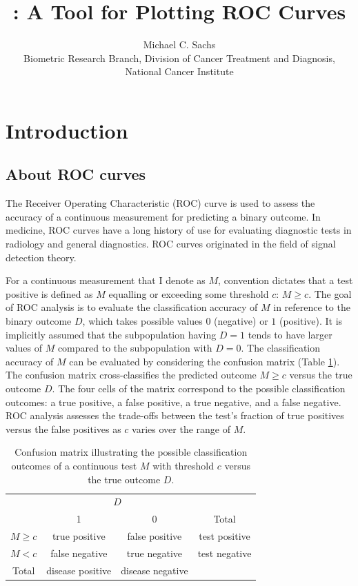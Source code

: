 \documentclass[codesnippet]{jss}
\author{		Michael C. Sachs\\Biometric Research Branch, Division of Cancer Treatment and Diagnosis,
National Cancer Institute		}
\title{\pkg{plotROC}: A Tool for Plotting ROC Curves}
\begin{document}
\section{Introduction}\label{introduction}

\subsection{About ROC curves}\label{about-roc-curves}

The Receiver Operating Characteristic (ROC) curve is used to assess the
accuracy of a continuous measurement for predicting a binary outcome. In
medicine, ROC curves have a long history of use for evaluating
diagnostic tests in radiology and general diagnostics. ROC curves
originated in the field of signal detection theory.

For a continuous measurement that I denote as \(M\), convention dictates
that a test positive is defined as \(M\) equalling or exceeding some
threshold \(c\): \(M \geq c\). The goal of ROC analysis is to evaluate
the classification accuracy of \(M\) in reference to the binary outcome
\(D\), which takes possible values \(0\) (negative) or \(1\) (positive).
It is implicitly assumed that the subpopulation having \(D = 1\) tends
to have larger values of \(M\) compared to the subpopulation with
\(D = 0\). The classification accuracy of \(M\) can be evaluated by
considering the confusion matrix (Table \ref{confus}). The confusion
matrix cross-classifies the predicted outcome \(M \geq c\) versus the
true outcome \(D\). The four cells of the matrix correspond to the
possible classification outcomes: a true positive, a false positive, a
true negative, and a false negative. ROC analysis assesses the
trade-offs between the test's fraction of true positives versus the
false positives as \(c\) varies over the range of \(M\).

\begin{table}
\begin{center}
\begin{tabular}{l|c|c|c}
\multicolumn{1}{c}{}&\multicolumn{2}{c}{$D$}&\\
\cline{2-3}
\multicolumn{1}{c|}{}&1&0&\multicolumn{1}{c}{Total}\\
\cline{2-3}
 $M \geq c$ & true positive & false positive & test positive\\
\cline{2-3}
 $M < c$ & false negative & true negative & test negative\\
\cline{2-3}
\multicolumn{1}{c}{Total} & \multicolumn{1}{c}{disease positive} & \multicolumn{1}{c}{disease negative} & \multicolumn{1}{c}{}\\
\end{tabular}
\caption{\label{confus} Confusion matrix illustrating the possible classification outcomes of a continuous test $M$ with threshold $c$ versus the true outcome $D$. }
\end{center}
\end{table}
\end{document}
